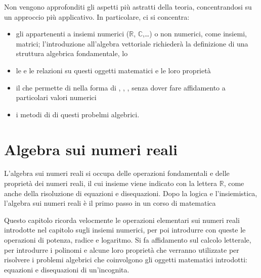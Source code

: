 \documentclass[letterpaper,10pt,italian]{jupyterBook}
\begin{document}
\sphinxAtStartPar
Non vengono approfonditi gli aspetti più astratti della teoria, concentrandosi su un approccio più applicativo. In particolare, ci si concentra:
\begin{itemize}
\item {} 
\sphinxAtStartPar
gli  appartenenti a insiemi numerici (\(\mathbb{R}\), \(\mathbb{C}\),…) o non numerici, come insiemi, matrici; l’introduzione all’algebra vettoriale richiederà la definizione di una struttura algebrica fondamentale, lo 

\item {} 
\sphinxAtStartPar
le  e le relazioni su questi oggetti matematici e le loro proprietà

\item {} 
\sphinxAtStartPar
il  che permette di  nella forma di , , , senza dover fare affidamento a particolari valori numerici

\item {} 
\sphinxAtStartPar
i metodi di  di questi probelmi algebrici.

\end{itemize}

\sphinxstepscope




\chapter{Algebra sui numeri reali}
\label{\detokenize{ch/algebra/real-algebra:algebra-sui-numeri-reali}}\label{\detokenize{ch/algebra/real-algebra:math-hs-algebra-real}}\label{\detokenize{ch/algebra/real-algebra::doc}}
\sphinxAtStartPar
L’algebra sui numeri reali si occupa delle operazioni fondamentali e delle proprietà dei numeri reali, il cui insieme viene indicato con la lettera \(\mathbb{R}\), come anche della risoluzione di equazioni e disequazioni. Dopo la logica e l’insiemistica, l’algebra sui numeri reali è il primo passo in un corso di matematica  

\sphinxAtStartPar
Questo capitolo ricorda velocmente le operazioni elementari sui numeri reali introdotte nel capitolo sugli insiemi numerici, per poi introdurre con queste le operazioni di potenza, radice e logaritmo. Si fa affidamento sul calcolo letterale, per introdurre i polinomi e alcune loro proprietà che verranno utilizzate per risolvere i problemi algebrici che coinvolgono gli oggetti matematici introdotti: equazioni e disequazioni di un’incognita.
\end{document}
